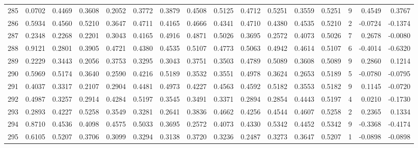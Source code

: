 \begin{tabular}{lrrrrrrrrrrrrrrr}
285 &      0.0702 &  0.4469 &  0.3608 &  0.2052 &  0.3772 &  0.3879 &  0.4508 &  0.5125 &  0.4712 &  0.5251 &   0.3559 &     0.5251 &      9 &                    0.4549 &                     0.3767 \\
286 &      0.5934 &  0.4560 &  0.5210 &  0.3647 &  0.4711 &  0.4165 &  0.4666 &  0.4341 &  0.4710 &  0.4380 &   0.4535 &     0.5210 &      2 &                   -0.0724 &                    -0.1374 \\
287 &      0.2348 &  0.2268 &  0.2201 &  0.3043 &  0.4165 &  0.4916 &  0.4871 &  0.5026 &  0.3695 &  0.2572 &   0.4073 &     0.5026 &      7 &                    0.2678 &                    -0.0080 \\
288 &      0.9121 &  0.2801 &  0.3905 &  0.4721 &  0.4380 &  0.4535 &  0.5107 &  0.4773 &  0.5063 &  0.4942 &   0.4614 &     0.5107 &      6 &                   -0.4014 &                    -0.6320 \\
289 &      0.2229 &  0.3443 &  0.2056 &  0.3753 &  0.3295 &  0.3043 &  0.3751 &  0.3503 &  0.4789 &  0.5089 &   0.3608 &     0.5089 &      9 &                    0.2860 &                     0.1214 \\
290 &      0.5969 &  0.5174 &  0.3640 &  0.2590 &  0.4216 &  0.5189 &  0.3532 &  0.3551 &  0.4978 &  0.3624 &   0.2653 &     0.5189 &      5 &                   -0.0780 &                    -0.0795 \\
291 &      0.4037 &  0.3317 &  0.2107 &  0.2904 &  0.4481 &  0.4973 &  0.4227 &  0.4563 &  0.4592 &  0.5182 &   0.3553 &     0.5182 &      9 &                    0.1145 &                    -0.0720 \\
292 &      0.4987 &  0.3257 &  0.2914 &  0.4284 &  0.5197 &  0.3545 &  0.3491 &  0.3371 &  0.2894 &  0.2854 &   0.4443 &     0.5197 &      4 &                    0.0210 &                    -0.1730 \\
293 &      0.2893 &  0.4227 &  0.5258 &  0.3549 &  0.3281 &  0.2641 &  0.3836 &  0.4662 &  0.4256 &  0.4544 &   0.4607 &     0.5258 &      2 &                    0.2365 &                     0.1334 \\
294 &      0.8710 &  0.4536 &  0.4098 &  0.4575 &  0.5033 &  0.3695 &  0.2572 &  0.4073 &  0.4330 &  0.5342 &   0.4452 &     0.5342 &      9 &                   -0.3368 &                    -0.4174 \\
295 &      0.6105 &  0.5207 &  0.3706 &  0.3099 &  0.3294 &  0.3138 &  0.3720 &  0.3236 &  0.2487 &  0.3273 &   0.3647 &     0.5207 &      1 &                   -0.0898 &                    -0.0898 \\

\end{tabular}
